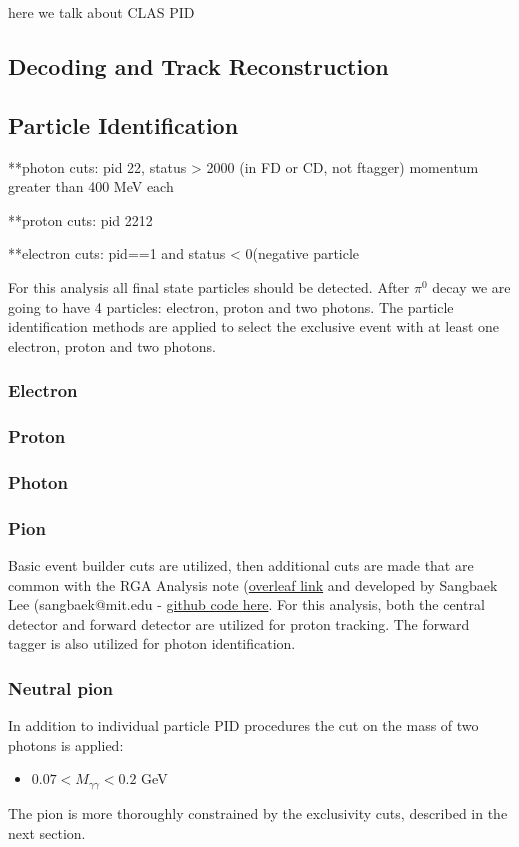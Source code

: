 here we talk about CLAS PID
\subsection{Decoding and Track Reconstruction}\label{sec:decrec}

\subsection{Particle Identification}
**photon cuts:
pid 22, status > 2000 (in FD or CD, not ftagger)
momentum greater than 400 MeV each

**proton cuts: pid 2212

**electron cuts: pid==1 and status < 0(negative particle


For this analysis all final state particles should be detected.
After $\pi^0$ decay we are going to have 4 particles: electron, proton and two photons.
The particle identification methods are applied to select the exclusive event with at least one electron, proton and two photons. 


    \subsubsection{Electron}
    \subsubsection{Proton}
    \subsubsection{Photon}
    \subsubsection{Pion}
    
    Basic event builder cuts are utilized, then additional cuts are made that are common with the RGA Analysis note (\href{https://www.overleaf.com/project/5ea737720942930001ff5e9c}{overleaf link} and developed by Sangbaek Lee (sangbaek@mit.edu - \href{https://github.com/Sangbaek/analysis_code/tree/analysis/pid}{github code here}. For this analysis, both the central detector and forward detector are utilized for proton tracking. The forward tagger is also utilized for photon identification. 
    


\subsubsection{Neutral pion}
    In addition to individual particle PID procedures the cut on the mass of two photons is applied:
    \begin{itemize}
    	\item $0.07<M_{\gamma\gamma}<0.2$ GeV
    \end{itemize}
    The pion is more thoroughly constrained by the exclusivity cuts, described in the next section.
    

